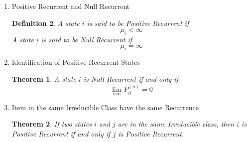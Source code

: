 \documentclass{article}
\newtheorem{definition}{Definition}[section]
\newtheorem{theorem}{Theorem}[section]
\begin{document}
\begin{enumerate}
\begin{definition}
          Then we have
          \begin{equation}
            \mu_{i} = F_{ii}'(1)
          \end{equation}
        \end{definition}
  \item Positive Recurrent and Null Recurrent
        \begin{definition}
          A state $i$ is said to be Positive Recurrent if
          \begin{equation}
            \mu_{i} < \infty
          \end{equation}
          A state $i$ is said to be Null Recurrent if
          \begin{equation}
            \mu_{i} = \infty
          \end{equation}
        \end{definition}
  \item Identification of Positive Recurrent States
        \begin{theorem}
          A state $i$ is Null Recurrent if and only if
          \begin{equation}
            \lim_{n\infty} P_{ii}^{(n)} = 0
          \end{equation}
        \end{theorem}
  \item Item in the same Irreducible Class have the same Recurrence
        \begin{theorem}
          If two states $i$ and $j$ are in the same Irreducible class, then
          $i$ is Positive Recurrent if and only if $j$ is Positive Recurrent.


\end{theorem}
\end{enumerate}
\end{document}
